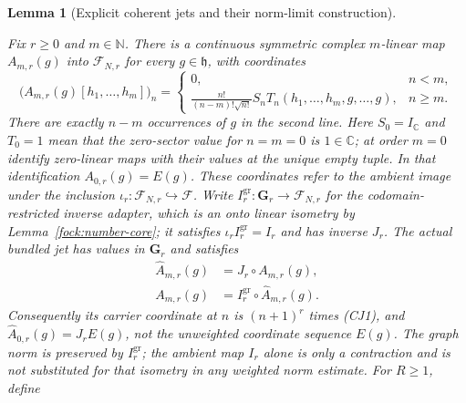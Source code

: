 \documentclass[11pt,a4paper]{article}
\newtheorem{lemma}[theorem]{Lemma}
\theoremstyle{definition}
\theoremstyle{remark}
\newcommand{\proofid}[1]{\par\smallskip{\normalfont\scriptsize\color{inkblue}Stable ID: \nolinkurl{#1}}\par\smallskip}
\begin{document}
\begin{lemma}[Explicit coherent jets and their norm-limit construction]
\label{fock:coherent-jets}
\proofid{fock:coherent-jets}
\par{}\par\smallskip

Fix $r\geq0$ and $m\in\mathbb N$. There is a continuous symmetric
complex $m$-linear map $A_{m,r}(g)$ into $\mathcal F_{N,r}$ for
 every $g\in\mathfrak h$, with coordinates
\[
 \big(A_{m,r}(g)[h_1,\ldots,h_m]\big)_n
 =\begin{cases}
 0,&n<m,\\[2pt]
 \displaystyle\frac{n!}{(n-m)!\sqrt{n!}}
 S_nT_n(h_1,\ldots,h_m,g,\ldots,g),&n\geq m.
 \end{cases}                                                     \tag{CJ1}
\]
There are exactly $n-m$ occurrences of $g$ in the second line.
Here $S_0=I_{\mathbb C}$ and $T_0=1$ mean that the zero-sector value for $n=m=0$
is $1\in\mathbb C$; at order $m=0$ identify zero-linear maps
with their values at the unique empty tuple. In that identification
$A_{0,r}(g)=E(g)$. These coordinates refer to the ambient image under the inclusion
$\iota_r:\mathcal F_{N,r}\hookrightarrow\mathcal F$.
Write $I_r^{\mathrm{gr}}:\mathbf G_r\to\mathcal F_{N,r}$ for
the codomain-restricted inverse adapter, which is an onto linear
isometry by Lemma~\ref{fock:number-core}; it satisfies
$\iota_r I_r^{\mathrm{gr}}=I_r$ and has inverse $J_r$.
The actual bundled jet has values in $\mathbf G_r$ and satisfies
\[
 \begin{aligned}
 \widehat A_{m,r}(g)&=J_r\circ A_{m,r}(g),\\
 A_{m,r}(g)&=I_r^{\mathrm{gr}}\circ\widehat A_{m,r}(g).
 \end{aligned}
\]
Consequently its carrier coordinate at $n$ is $(n+1)^r$ times
(CJ1), and $\widehat A_{0,r}(g)=J_rE(g)$, not the unweighted
coordinate sequence $E(g)$. The graph norm is preserved by $I_r^{\mathrm{gr}}$; the ambient
map $I_r$ alone is only a contraction and is not substituted for
that isometry in any weighted norm estimate.
For $R\geq1$, define
\begin{align*}

\end{align*}
\end{lemma}
\end{document}
